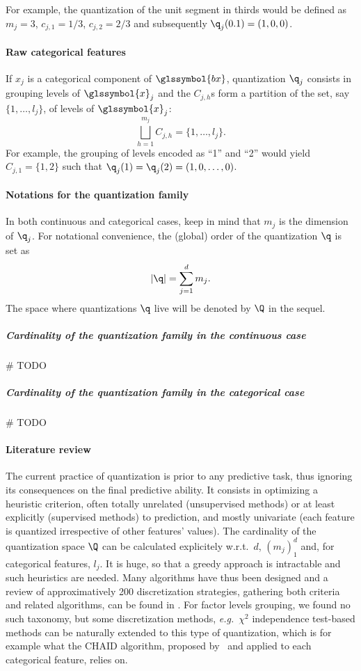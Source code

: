 For example, the quantization of the unit segment in thirds would be defined as $m_j=3$, $c_{j,1} = 1/3$, $c_{j,2} = 2/3$ and subsequently $\q_j(0.1) = (1,0,0)$.
\paragraph{Raw categorical features} If $x_j$ is a categorical component of $\glssymbol{bx}$, quantization $\q_j$ consists in grouping levels of $\glssymbol{x}_j$ and the $C_{j,h}$s form a partition of the set, say $\{1,\ldots,l_j\}$, of levels of $\glssymbol{x}_j$: 
\begin{equation*}
\bigsqcup_{h=1}^{m_j}C_{j,h}=\{1,\ldots,l_j\}.
\end{equation*}
For example, the grouping of levels encoded as ``1'' and ``2'' would yield $C_{j,1} = \{1,2\}$ such that $\q_j(1) = \q_j(2) = (1,0,\ldots,0)$.

\paragraph{Notations for the quantization family}

In both continuous and categorical cases, keep in mind that $m_j$ is the dimension of $\q_j$. For notational convenience, the (global) order of the quantization $\q$ is set as 
\[|\q|=\sum_{j=1}^d m_j.\]
The space where quantizations $\q$ live will be denoted by $\Q$ in the sequel.



\subparagraph{Cardinality of the quantization family in the continuous case}

 \# TODO
 
 
 \subparagraph{Cardinality of the quantization family in the categorical case}

 
  \# TODO



\paragraph{Literature review}

The current practice of quantization is prior to any predictive task, thus ignoring its consequences on the final predictive ability. It consists in optimizing a heuristic criterion, often totally unrelated (unsupervised methods) or at least explicitly (supervised methods) to prediction, and mostly univariate (each feature is quantized irrespective of other features' values). The cardinality of the quantization space $\Q$ can be calculated explicitely w.r.t.\ $d$, $(m_j)_1^d$ and, for categorical features, $l_j$. It is huge, so that a greedy approach is intractable and such heuristics are needed.
Many algorithms have thus been designed and a review of approximatively 200 discretization strategies, gathering both criteria and related algorithms, can be found in \cite{ramirez2016data}. For factor levels grouping, we found no such taxonomy, but some discretization methods, \textit{e.g.}\ $\chi^2$ independence test-based methods can be naturally extended to this type of quantization, which is for example what the CHAID algorithm, proposed by~\cite{kass1980exploratory} and applied to each categorical feature, relies on.


